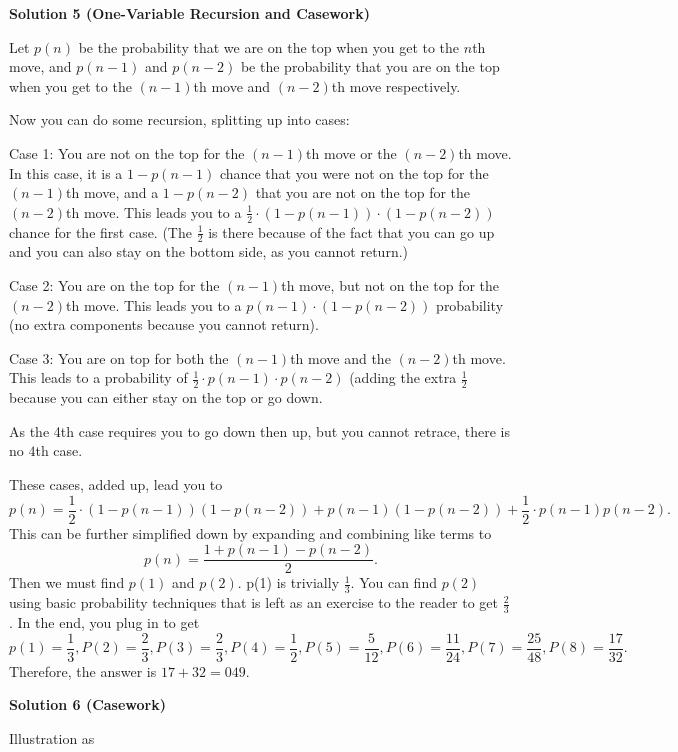 \begin{enumerate}
 



\textbf{Solution 5 (One-Variable Recursion and Casework)}

Let $p(n)$ be the probability that we are on the top when you get to the $n$th move, and $p(n-1)$ and $p(n-2)$ be the probability that you are on the top when you get to the $(n-1)$th move and $(n-2)$th move respectively.

 Now you can do some recursion, splitting up into cases:

 Case 1: You are not on the top for the $(n-1)$th move or the $(n-2)$th move. In this case, it is a $1-p(n-1)$ chance that you were not on the top for the $(n-1)$th move, and a $1-p(n-2)$ that you are not on the top for the $(n-2)$th move. This leads you to a $\frac{1}{2}\cdot(1-p(n-1))\cdot(1-p(n-2))$ chance for the first case. (The $\frac12$ is there because of the fact that you can go up and you can also stay on the bottom side, as you cannot return.)

 Case 2: You are on the top for the $(n-1)$th move, but not on the top for the $(n-2)$th move. This leads you to a $p(n-1)\cdot(1-p(n-2))$ probability (no extra components because you cannot return).

 Case 3: You are on top for both the $(n-1)$th move and the $(n-2)$th move. This leads to a probability of $\frac{1}{2}\cdot p(n-1)\cdot p(n-2)$ (adding the extra $\frac12$ because you can either stay on the top or go down.

 As the 4th case requires you to go down then up, but you cannot retrace, there is no $4$th case.

 These cases, added up, lead you to 
 \[p(n)=\frac{1}{2}\cdot(1-p(n-1))(1-p(n-2))+p(n-1)(1-p(n-2))+\frac{1}{2}\cdot p(n-1)p(n-2).\] This can be further simplified down by expanding and combining like terms to 
 \[p(n)=\frac{1+p(n-1)-p(n-2)}{2}.\]Then we must find $p(1)$ and $p(2)$. p(1) is trivially $\frac{1}{3}$. You can find $p(2)$ using basic probability techniques that is left as an exercise to the reader to get $\frac{2}{3}$. In the end, you plug in to get
 \[p(1)=\frac{1}{3}, P(2)=\frac{2}{3}, P(3)=\frac{2}{3}, P(4)=\frac{1}{2}, P(5)=\frac{5}{12}, P(6)=\frac{11}{24}, P(7)=\frac{25}{48}, P(8)=\boxed{\frac{17}{32}}.\]Therefore, the answer is $17+32=\boxed{049}$.

 



\textbf{Solution 6 (Casework)}

Illustration as


\end{enumerate}
